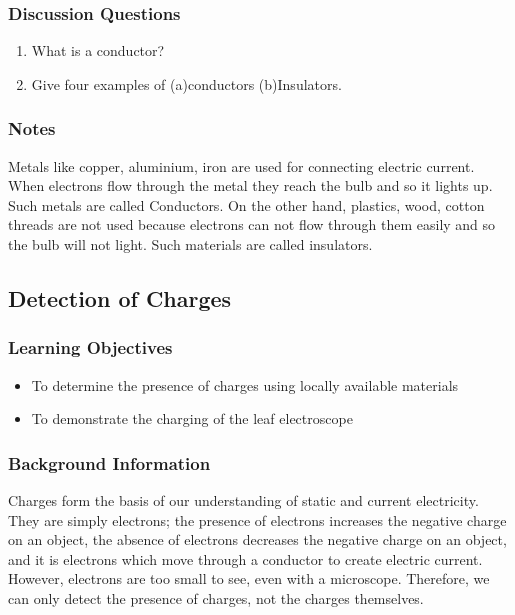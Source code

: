 \subsubsection*{Discussion Questions}
\begin{enumerate}
\item{What is a conductor?}
\item{Give four examples of (a)conductors (b)Insulators.} 
\end{enumerate}

\subsubsection*{Notes}
Metals like copper, aluminium, iron are used for connecting electric current.  When electrons flow through the metal they reach the bulb and so it lights up.  Such metals are called Conductors. On the other hand, plastics, wood, cotton threads are not used because electrons can not flow through them easily and so the bulb will not light.  Such materials are called insulators.  

\subsection{Detection of Charges}

\subsubsection*{Learning Objectives}
\begin{itemize}
\item{To determine the presence of charges using locally available materials} 
\item{To demonstrate the charging of the leaf electroscope} 
\end{itemize}

\subsubsection*{Background Information}
Charges form the basis of our understanding of static and current electricity.  They are simply electrons; the presence of electrons increases the negative charge on an object, the absence of electrons decreases the negative charge on an object, and it is electrons which move through a conductor to create electric current.  However, electrons are too small to see, even with a microscope.  Therefore, we can only detect the presence of charges, not the charges themselves.

